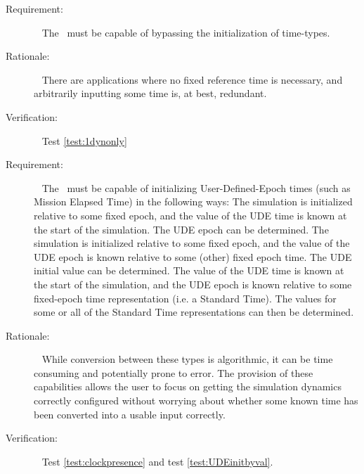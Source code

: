 \label{reqt:timeinitializationbypass}
\begin{description}
  \item[Requirement:]\ \newline
    The \timeDesc\ must be capable of bypassing the initialization of
		time-types.
  \item[Rationale:]\ \newline
    There are applications where no fixed reference time is necessary, and
		arbitrarily inputting some time is, at best, redundant.
  \item[Verification:]\ \newline
	  Test \vref{test:1dynonly}
\end{description}


\label{reqt:timeinitializationUDE}
\begin{description}
  \item[Requirement:]\ \newline
    The \timeDesc\ must be capable of initializing User-Defined-Epoch times
		(such as Mission Elapsed Time) in the following ways:
		\label{reqt:func_time_initialization_UDE_FE} \newline
		  The simulation is initialized relative to some fixed epoch, 
		  and the value
			of the UDE time is known at the start of the 
			simulation.  The UDE epoch
			can be determined.
		\label{reqt:func_time_initialization_UDEe_FE} \newline
		  The simulation is initialized relative to some fixed epoch, 
		  and the value
			of the UDE epoch is known relative to some (other) 
			fixed epoch time.  The
			UDE initial value	can be determined.
		\label{reqt:func_time_initialization_UDE_UDEe} \newline
		  The value of the UDE time is known at the start of the 
		  simulation, and the
			UDE epoch is known relative to some fixed-epoch time 
			representation (i.e. a Standard Time).  
			The values for some or all of the Standard Time 
			representations can then be determined.
			
  \item[Rationale:]\ \newline
    While conversion between these types is algorithmic, it can be time 
    consuming and potentially prone to error.  The provision of these 
    capabilities allows the user to focus on getting the simulation dynamics 
    correctly configured without worrying about whether some known time has 
    been converted into a usable input correctly.
  \item[Verification:]\ \newline
	  Test \vref{test:clockpresence} and test \vref{test:UDEinitbyval}.
\end{description}



